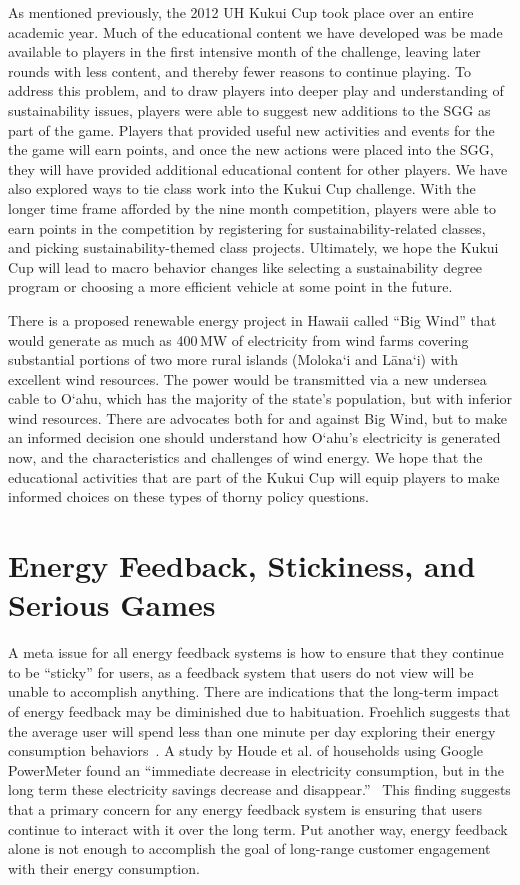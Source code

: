 \documentclass[10pt, conference, compsocconf]{IEEEtran-old}
\begin{document}
As mentioned previously, the 2012 UH Kukui Cup took place over an entire academic year. Much of the educational content we have developed was be made available to players in the first intensive month of the challenge, leaving later rounds with less content, and thereby fewer reasons to continue playing. To address this problem, and to draw players into deeper play and understanding of sustainability issues, players were able to suggest new additions to the SGG as part of the game. Players that provided useful new activities and events for the the game will earn points, and once the new actions were placed into the SGG, they will have provided additional educational content for other players. We have also explored ways to tie class work into the Kukui Cup challenge. With the longer time frame afforded by the nine month competition, players were able to earn points in the competition by registering for sustainability-related classes, and picking sustainability-themed class projects. Ultimately, we hope the Kukui Cup will lead to macro behavior changes like selecting a sustainability degree program or choosing a more efficient vehicle at some point in the future.

There is a proposed renewable energy project in Hawaii called ``Big Wind'' that would generate as much as 400\,MW of electricity from wind farms covering substantial portions of two more rural islands (Moloka`i and L\=ana`i) with excellent wind resources. The power would be transmitted via a new undersea cable to O`ahu, which has the majority of the state's population, but with inferior wind resources. There are advocates both for and against Big Wind, but to make an informed decision one should understand how O`ahu's electricity is generated now, and the characteristics and challenges of wind energy. We hope that the educational activities that are part of the Kukui Cup will equip players to make informed choices on these types of thorny policy questions.


\section{Energy Feedback, Stickiness, and Serious Games}

A meta issue for all energy feedback systems is how to ensure that they continue to be ``sticky'' for users, as a feedback system that users do not view will be unable to accomplish anything. There are indications that the long-term impact of energy feedback may be diminished due to habituation. Froehlich suggests that the average user will spend less than one minute per day exploring their energy consumption behaviors~\cite{Froehlich2010-BECC}. A study by Houde et al. of households using Google PowerMeter found an ``immediate decrease in electricity consumption, but in the long term these electricity savings decrease and disappear.''~\cite{Houde2013-powermeter} This finding suggests that a primary concern for any energy feedback system is ensuring that users continue to interact with it over the long term. Put another way, energy feedback alone is not enough to accomplish the goal of long-range customer engagement with their energy consumption.
\end{document}
